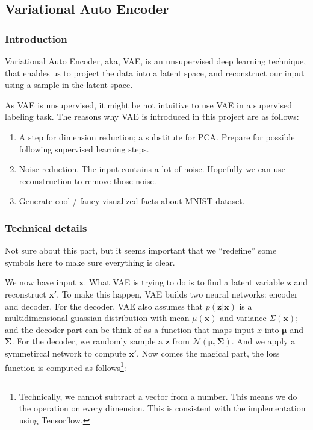 \documentclass[a4paper,10pt,UTF8]{article}
\renewcommand*{\vec}[1]{\boldsymbol{#1}}
\numberwithin{equation}{section}
\numberwithin{figure}{section}
\begin{document}
\subsection{Variational Auto Encoder}

\subsubsection{Introduction}

Variational Auto Encoder, aka, VAE, is an unsupervised deep learning technique, that enables us to project the data into a latent space, and reconstruct our input using a sample in the latent space.

As VAE is unsupervised, it might be not intuitive to use VAE in a supervised labeling task. The reasons why VAE is introduced in this project are as follows:

\begin{enumerate}
    \item A step for dimension reduction; a substitute for PCA. Prepare for possible following supervised learning steps.
    \item Noise reduction. The input contains a lot of noise. Hopefully we can use reconstruction to remove those noise.
    \item Generate cool / fancy visualized facts about MNIST dataset.
\end{enumerate}

\subsubsection{Technical details}

Not sure about this part, but it seems important that we ``redefine'' some symbols here to make sure everything is clear.

We now have input $\vec{x}$. What VAE is trying to do is to find a latent variable $\vec{z}$ and reconstruct $\vec{x'}$. To make this happen, VAE builds two neural networks: encoder and decoder. For the decoder, VAE also assumes that $p(\vec{z} | \vec{x})$ is a multidimensional guassian distribution with mean $\mu(\vec{x})$ and variance $\Sigma(\vec{x})$; and the decoder part can be think of as a function that maps input $x$ into $\vec{\mu}$ and $\vec{\Sigma}$. For the decoder, we randomly sample a $\vec{z}$ from $\mathcal{N}(\vec{\mu}, \vec{\Sigma})$. And we apply a symmetircal network to compute $\vec{x'}$. Now comes the magical part, the loss function is computed as follows\footnote{Technically, we cannot subtract a vector from a number. This means we do the operation on every dimension. This is consistent with the implementation using Tensorflow.}:
\end{document}
